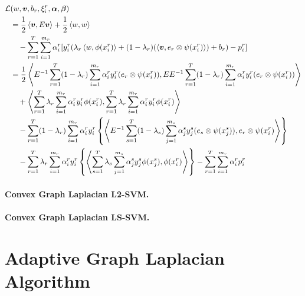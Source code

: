 \begin{equation}\nonumber
    \begin{aligned}
            \mathcal{L}&({w}, \bm{v}, b_r, \xi_i^r, {\bm{\alpha}}, \bm{\beta}) \\
            &= \frac{1}{2} \left\langle \bm{v}, E\bm{v} \right\rangle + \frac{1}{2} \left\langle w, w \right\rangle
            \\ &\quad  - \sum_{r=1}^T \sum_{i=1}^{m_r}{ \alpha_i^r [y_{i}^r (\lambda_r \left\langle w, \phi(x_i^r) \right\rangle + (1 - \lambda_r) (\left\langle \bm{v}, e_r \otimes \psi({x}_i^r) \right\rangle) + b_r) - p_{i}^r]   } \\
            &= \frac{1}{2} \left\langle E^{-1} \sum_{r=1}^T (1 - \lambda_r) \sum_{i=1}^{m_r}{\alpha_i^r y_i^r (e_r \otimes \psi({x}_i^r))}, E E^{-1} \sum_{r=1}^T (1 - \lambda_r) \sum_{i=1}^{m_r}{\alpha_i^r y_i^r (e_r \otimes \psi({x}_i^r))} \right\rangle \\ 
            &\quad + \left\langle \sum_{r=1}^T \lambda_r \sum_{i=1}^{m_r}{\alpha_i^r y_i^r \phi(x_i^r)}, \sum_{r=1}^T \lambda_r \sum_{i=1}^{m_r}{\alpha_i^r y_i^r \phi(x_i^r)} \right\rangle \\
            &\quad - \sum_{r=1}^T (1 - \lambda_r) \sum_{i=1}^{m_r}{ \alpha_i^r y_{i}^r \left\lbrace  \left\langle E^{-1} \sum_{s=1}^T (1 - \lambda_s) \sum_{j=1}^{m_s}{\alpha_j^s y_j^s (e_s \otimes \psi({x}_j^s))}, e_r \otimes \psi(x_i^r) \right\rangle \right\rbrace   } \\
            &\quad - \sum_{r=1}^T \lambda_r \sum_{i=1}^{m_r}{ \alpha_i^r y_{i}^r \left\lbrace  \left\langle \sum_{s=1}^T \lambda_s \sum_{j=1}^{m_s}{\alpha_j^s y_j^s \phi(x_j^s)}, \phi(x_i^r) \right\rangle \right\rbrace   } - \sum_{r=1}^T \sum_{i=1}^{m_r} \alpha_i^r p_i^r
    \end{aligned}
\end{equation}

\paragraph*{Convex Graph Laplacian L2-SVM.\\}





\paragraph*{Convex Graph Laplacian LS-SVM.\\}


\section{Adaptive Graph Laplacian Algorithm}

